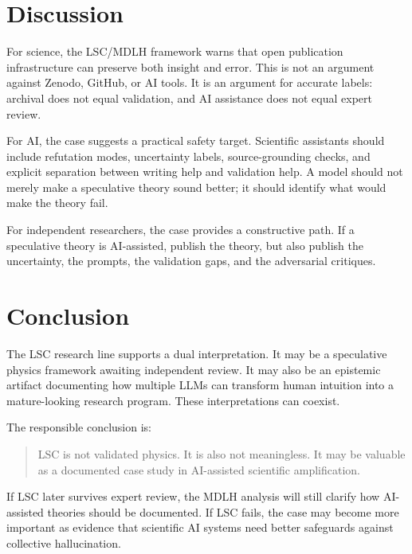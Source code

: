\documentclass[11pt,a4paper]{article}
\begin{document}
\section{Discussion}

For science, the LSC/MDLH framework warns that open publication infrastructure can preserve both insight and error. This is not an argument against Zenodo, GitHub, or AI tools. It is an argument for accurate labels: archival does not equal validation, and AI assistance does not equal expert review.

For AI, the case suggests a practical safety target. Scientific assistants should include refutation modes, uncertainty labels, source-grounding checks, and explicit separation between writing help and validation help. A model should not merely make a speculative theory sound better; it should identify what would make the theory fail.

For independent researchers, the case provides a constructive path. If a speculative theory is AI-assisted, publish the theory, but also publish the uncertainty, the prompts, the validation gaps, and the adversarial critiques.

\section{Conclusion}

The LSC research line supports a dual interpretation. It may be a speculative physics framework awaiting independent review. It may also be an epistemic artifact documenting how multiple LLMs can transform human intuition into a mature-looking research program. These interpretations can coexist.

The responsible conclusion is:

\begin{quote}
LSC is not validated physics. It is also not meaningless. It may be valuable as a documented case study in AI-assisted scientific amplification.
\end{quote}

If LSC later survives expert review, the MDLH analysis will still clarify how AI-assisted theories should be documented. If LSC fails, the case may become more important as evidence that scientific AI systems need better safeguards against collective hallucination.
\end{document}
